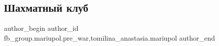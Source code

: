  
 
 
 
 

\subsection{Шахматный клуб}
\label{sec:11_02_2023.fb.fb_group.mariupol.pre_war.3.shakhmatnii_klub}
 
\ifcmt
 author_begin
   author_id fb_group.mariupol.pre_war,tomilina_anastasia.mariupol
 author_end
\fi
